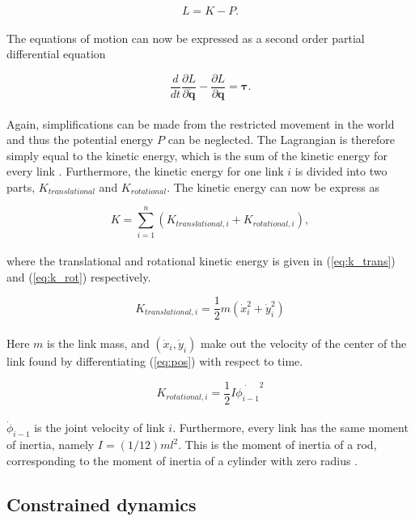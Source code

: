 \begin{equation}
    L = K - P.
\end{equation}
\\
The equations of motion can now be expressed as a second order partial differential equation

\begin{equation} \label{eq:Lagrange}
    \frac{d}{d t} \frac{\partial L}{\partial \mathbf{\dot{q}}} - \frac{\partial L}{\partial \mathbf{q}} = \boldsymbol{\tau}.
\end{equation}
\\
Again, simplifications can be made from the restricted movement in the world and thus the potential energy $P$ can be neglected. The Lagrangian is therefore simply equal to the kinetic energy, which is the sum of the kinetic energy for every link \cite{rezapour2014path}. Furthermore, the kinetic energy for one link $i$ is divided into two parts, $K_{translational}$ and $K_{rotational}$.
The kinetic energy can now be express as

\begin{equation}\label{eq:kinen}
    K = \sum_{i=1}^{n} (K_{translational,i} + K_{rotational,i}),
\end{equation}
\\
where the translational and rotational kinetic energy is given in (\ref{eq:k_trans}) and (\ref{eq:k_rot}) respectively.

\begin{equation} \label{eq:k_trans}
    K_{translational,i} = \frac{1}{2} m (\dot{x}_i^2 + \dot{y}_i^2)
\end{equation}
\\
Here $m$ is the link mass, and $(\dot{x}_i, \dot{y}_i)$ make out the velocity of the center of the link found by differentiating (\ref{eq:pos}) with respect to time. 

\begin{equation} \label{eq:k_rot}
    K_{rotational,i} = \frac{1}{2}I\dot{\phi_{i-1}}^2
\end{equation}
\\
$\dot{\phi}_{i-1}$ is the joint velocity of link $i$. Furthermore, every link has the same moment of inertia, namely $I = (1/12)ml^2$. This is the moment of inertia of a rod, corresponding to the moment of inertia of a cylinder with zero radius \cite{lynch2017modern}.



\subsection{Constrained dynamics}\label{subseq:constr_dyn}

